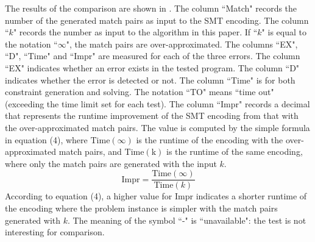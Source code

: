 The results of the comparison are shown in .  
The column ``Match" records the number of the generated match pairs as input to the SMT encoding. The column ``$k$" records the number as input to the algorithm in this paper. If ``$k$" is equal to the notation ``$\infty$", the match pairs are over-approximated. The columns ``EX", ``D", ``Time" and ``Impr" are measured for each of the three errors. The column ``EX" indicates whether an error exists in the tested program. The column ``D" indicates whether the error is detected or not. The column ``Time" is for both constraint generation and solving. The notation ``TO" means ``time out" (exceeding the time limit set for each test). The column ``Impr" records a decimal that represents the runtime improvement of the SMT encoding from that with the over-approximated match pairs. 
The value is computed by the simple formula in equation (4), where $\mathrm{Time}(\infty)$ is the runtime of the encoding with the over-approximated match pairs, and $\mathrm{Time}(\mathrm{k})$ is the runtime of the same encoding, where only the match pairs are generated with the input $k$. 
\begin{equation}
\mathrm{Impr} = \frac{\mathrm{Time}(\infty)}{\mathrm{Time}(\mathit{k})}
\end{equation}
According to equation (4), a higher value for $\mathrm{Impr}$ indicates a shorter runtime of the encoding where the problem instance is simpler with the match pairs generated with $k$.
The meaning of the symbol ``-" is ``unavailable": the test is not interesting for comparison.

